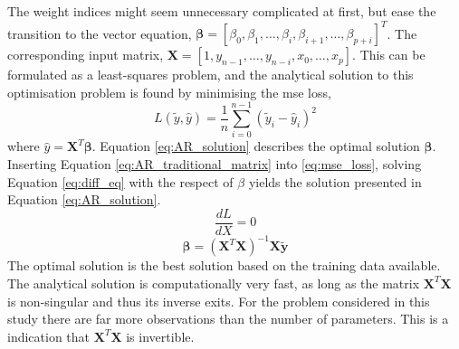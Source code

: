 The weight indices might seem unnecessary complicated at first, but ease the transition to the vector equation, $\mathbf{\beta} = [\beta_0, \beta_1, \ldots, \beta_i, \beta_{i+1}, \ldots, \beta_{p+i}]^T$. The corresponding input matrix, $\mathbf{X} = [1, y_{n-1}, \ldots, y_{n-i}, x_0, \ldots, x_p]$. 
This can be formulated as a least-squares problem, and the analytical solution to this optimisation problem is found by minimising the \acrfull{mse} loss, 
\begin{equation} \label{eq:mse_loss}
    L (\tilde{y}, \hat{y}) = \frac{1}{n} \sum_{i=0}^{n-1}(\tilde{y}_i-\hat{y}_i)^2
\end{equation} 
where $\hat{y} = \mathbf{X}^T \mathbf{\beta}$. Equation \eqref{eq:AR_solution} describes the optimal solution $\mathbf{\beta}$. Inserting Equation \eqref{eq:AR_traditional_matrix} into \eqref{eq:mse_loss}, solving Equation \eqref{eq:diff_eq} with the respect of $\beta$ yields the solution presented in Equation \eqref{eq:AR_solution}.  
\begin{equation} \label{eq:diff_eq}
    \frac{dL}{dX} = 0
\end{equation}
\begin{equation} \label{eq:AR_solution}
    \mathbf{\beta}  = \left( \mathbf{X}^T\mathbf{X}\right)^{-1} \mathbf{X}\tilde{\mathbf{y}}
\end{equation}
The optimal solution is the best solution based on the training data available. The analytical solution is computationally very fast, as long as the matrix $\mathbf{X}^T\mathbf{X}$ is non-singular and thus its inverse exits. For the problem considered in this study there are far more observations than the number of parameters. This is a indication that $\mathbf{X}^T\mathbf{X}$ is invertible. %

